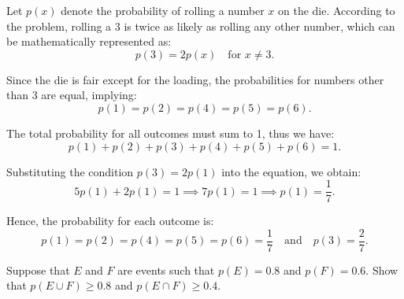         \begin{solution}
            Let \( p(x) \) denote the probability of rolling a number \( x \) on the die. According to the problem, rolling a 3 is twice as likely as rolling any other number, which can be mathematically represented as:
            \[
                p(3) = 2p(x) \quad \text{for } x \neq 3.
            \]
        
            Since the die is fair except for the loading, the probabilities for numbers other than 3 are equal, implying:
            \[
                p(1) = p(2) = p(4) = p(5) = p(6).
            \]
        
            The total probability for all outcomes must sum to 1, thus we have:
            \[
                p(1) + p(2) + p(3) + p(4) + p(5) + p(6) = 1.
            \]
        
            Substituting the condition \( p(3) = 2p(1) \) into the equation, we obtain:
            \[
                5p(1) + 2p(1) = 1 \implies 7p(1) = 1 \implies p(1) = \frac{1}{7}.
            \]
        
            Hence, the probability for each outcome is:
            \[
                p(1) = p(2) = p(4) = p(5) = p(6) = \frac{1}{7} \quad \text{and} \quad p(3) = \frac{2}{7}.
            \]
        \end{solution}

        \begin{exercise}
            Suppose that \(E\) and \(F\) are events such that \(p(E) = 0.8\) and \(p(F) = 0.6\). Show that \(p(E \cup F) \geq 0.8\) and \(p(E \cap F) \geq 0.4\).
        \end{exercise}
        
